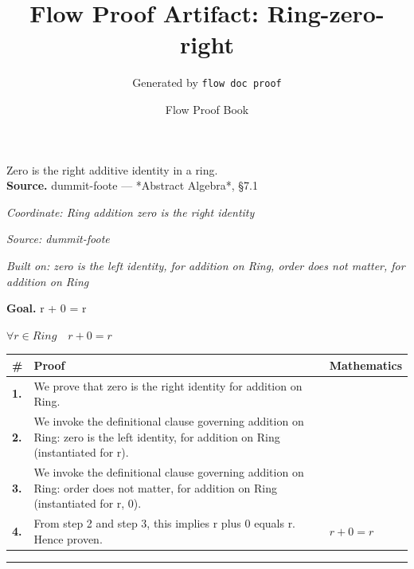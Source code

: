 \documentclass[11pt]{article}
\title{Flow Proof Artifact: Ring-zero-right}
\author{Generated by \texttt{flow doc proof}}
\date{Flow Proof Book}
\theoremstyle{definition}
\begin{document}
\maketitle
Zero is the right additive identity in a ring.\\[0.5em]
\textbf{Source.} dummit-foote — *Abstract Algebra*, §7.1\\[0.5em]
\bigskip
{}\par
\smallskip\noindent\textit{Coordinate: Ring \cdot addition \cdot zero is the right identity}\par
\smallskip\noindent\textit{Source: dummit-foote}\par
\smallskip\noindent\textit{Built on: zero is the left identity, for addition on Ring, order does not matter, for addition on Ring}\par
\medskip
\noindent\textbf{Goal.} r + 0 = r\par
\noindent$\displaystyle \forall r \in Ring\quad r + 0 = r$\par
\medskip
\noindent
\begin{tabular}{@{} >{\raggedright\arraybackslash}p{} >{\raggedright\arraybackslash}p{} >{\raggedleft\arraybackslash}p{} @{}}
\textbf{\#} & \textbf{Proof} & \textbf{Mathematics} \\
\midrule
\textbf{1.} & We prove that zero is the right identity for addition on Ring. & \\[0.45em]
\textbf{2.} & We invoke the definitional clause governing addition on Ring: zero is the left identity, for addition on Ring (instantiated for r). & \\[0.45em]
\textbf{3.} & We invoke the definitional clause governing addition on Ring: order does not matter, for addition on Ring (instantiated for r, 0). & \\[0.45em]
\textbf{4.} & From step 2 and step 3, this implies r plus 0 equals r. Hence proven. & $\displaystyle r + 0 = r$ \\[0.45em]
\bottomrule
\end{tabular}
\label{thm:Ring-addition-zero_is_the_right_identity}
\par\medskip\hrule
\end{document}
